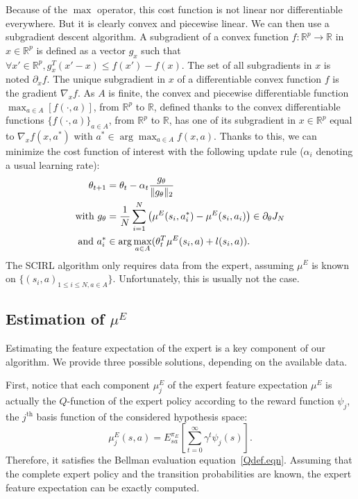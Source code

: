 \documentclass{article}
\begin{document}
Because of the $\max$ operator, this cost function is not linear nor
differentiable everywhere. But it is clearly convex and piecewise
linear.
%
We can then use a subgradient descent algorithm. A subgradient of a
convex function $f:\mathbb{R}^p\rightarrow \mathbb{R}$ in
$x\in\mathbb{R}^p$ is defined as a vector $g_x$ such that $\forall
x' \in \mathbb{R}^p, g_x^T(x'-x)\leq f(x')-f(x)$. The set of all
subgradients in $x$ is noted $\partial_xf$. The unique subgradient
in $x$ of a differentiable convex function $f$ is the gradient
$\nabla_xf$. As $A$ is finite, the convex and piecewise
differentiable function $\max_{a\in A}[f(\cdot,a)]$, from
$\mathbb{R}^p$ to $\mathbb{R}$, defined thanks to the convex
differentiable functions $\{f(\cdot,a)\}_{a\in A}$, from
$\mathbb{R}^p$ to $\mathbb{R}$, has one of its subgradient in
$x\in\mathbb{R}^p$ equal to $\nabla_xf(x,a^*)$ with
$a^*\in\arg\max_{a\in A}f(x,a)$. Thanks to this, we can minimize the
cost function of interest with the following update rule ($\alpha_i$
denoting a usual learning rate):%
\begin{align}
  \theta_{t+1}&=\theta_t -\alpha_t\frac{g_{\theta}}{\|g_{\theta}\|_2}
  \\
  \text{with }
  g_{\theta} &= {1\over N}\sum\limits_{i=1}^N\left(\mu^E(s_i,a^*_i) - \mu^E(s_i,a_i)\right)\in \partial_\theta J_N
  \\
  \text{and } a^*_i &\in \arg\max_{a\in A}(\theta_t^T \mu^E(s_i,a) +
  l(s_i,a)).
\end{align}
The SCIRL algorithm only requires data from the expert, assuming
$\mu^E$ is known on $\{(s_i,a)_{1\leq i \leq N,a\in A}\}$.
Unfortunately, this is usually not the case.


\subsection{Estimation of $\mu^E$}
\label{calculmu.sec}

Estimating the feature expectation of the expert is a key component
of our algorithm. We provide three possible solutions, depending on
the available data.

First, notice that each component $\mu_j^E$ of the expert feature
expectation $\mu^E$ is actually the $Q$-function of the expert
policy according to the reward function $\psi_j$, the $j^\text{th}$
basis function of the considered hypothesis space:
\begin{equation}
\mu^E_j(s,a) = E^{\pi_E}_{sa}[\sum\limits_{t=0}^\infty \gamma^t
\psi_j(s)].\label{eq:muE_bellman}
\end{equation}
Therefore, it satisfies the Bellman evaluation
equation~\eqref{Qdef.eqn}. Assuming that the complete expert policy and the
transition probabilities are known, the expert feature expectation
can be exactly computed.
\end{document}
